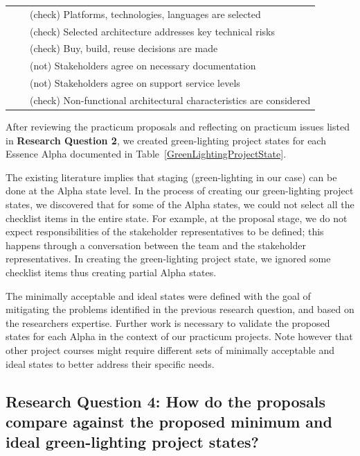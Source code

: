 \begin{table}
\begin{tabular}{|l|p{2.50in}|p{3.35in}|}
                &                                     & (check) Platforms, technologies, languages are selected \\
                &                                     & (check) Selected architecture addresses key technical risks \\
                &                                     & (check) Buy, build, reuse decisions are made \\
                &                                     & (not) Stakeholders agree on necessary documentation \\
                &                                     & (not) Stakeholders agree on support service levels \\
                &                                     & (check) Non-functional architectural characteristics are considered \\ \hline
\end{tabular}
\end{table}

After reviewing the practicum proposals and reflecting on practicum
issues listed in \textbf{Research Question 2}, we created green-lighting project
states for each Essence Alpha documented in Table~\ref{GreenLightingProjectState}.

The existing literature \cite{EssenceBook} implies
that staging (green-lighting in our case) can be done at the Alpha state level. In the process of creating our green-lighting project states, we discovered that for some of the Alpha states, we could not select all the checklist items in the entire state. For example, at the proposal stage, we do not expect responsibilities of the stakeholder representatives to be defined; this happens through a conversation between the team and the stakeholder representatives. In creating the green-lighting project state, we ignored some checklist items thus creating partial Alpha states.

The minimally acceptable and ideal states were defined with the goal of mitigating the problems identified in the previous research question, and based on the researchers expertise. Further work is necessary to validate the proposed states for each Alpha in the context of our practicum projects. Note however that other project courses might require different sets of minimally acceptable and ideal states to better address their specific needs.

\subsection{Research Question 4: How do the proposals
compare against the proposed minimum and ideal green-lighting project
states?}

